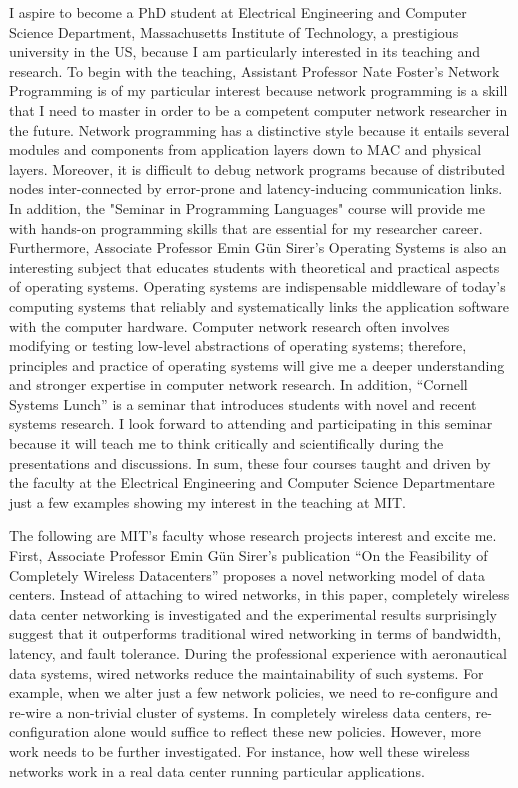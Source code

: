 \documentclass[a4paper,10pt]{report}
\newcommand{\university}{Massachusetts Institute of Technology}
\newcommand{\department}{Electrical Engineering and Computer Science Department}
\newcommand{\uniabbre}{MIT}
\begin{document}
\vspace{0.2cm}
I aspire to become a PhD student at \department, \university, a prestigious university in the US, because I am particularly interested in its teaching and research. To begin with the teaching, Assistant Professor Nate Foster's Network Programming is of my particular interest because network programming is a skill that I need to master in order to be a competent computer network researcher in the future. Network programming has a distinctive style because it entails several modules and components from application layers down to MAC and physical layers. Moreover, it is difficult to debug network programs because of distributed nodes inter-connected by error-prone and latency-inducing communication links. In addition, the "Seminar in Programming Languages" course will provide me with hands-on programming skills that are essential for my researcher career. Furthermore, Associate Professor Emin Gün Sirer's Operating Systems is also an interesting subject that educates students with theoretical and practical aspects of operating systems. Operating systems are indispensable middleware of today's computing systems that reliably and systematically links the application software with the computer hardware. Computer network research often involves modifying or testing low-level abstractions of operating systems; therefore, principles and practice of operating systems will give me a deeper understanding and stronger expertise in computer network research. In addition, ``Cornell Systems Lunch'' is a seminar that introduces students with novel and recent systems research. I look forward to attending and participating in this seminar because it will teach me to think critically and scientifically during the presentations and discussions. In sum, these four courses taught and driven by the faculty at the \department \space are just a few examples showing my interest in the teaching at \uniabbre .

\vspace{0.2cm}
The following are \uniabbre's faculty whose research projects interest and excite me. First, Associate Professor Emin Gün Sirer's publication ``On the Feasibility of Completely Wireless Datacenters'' proposes a novel networking model of data centers. Instead of attaching to wired networks, in this paper, completely wireless data center networking is investigated and the experimental results surprisingly suggest that it outperforms traditional wired networking in terms of bandwidth, latency, and fault tolerance. During the professional experience with aeronautical data systems, wired networks reduce the maintainability of such systems. For example, when we alter just a few network policies, we need to re-configure and re-wire a non-trivial cluster of systems. In completely wireless data centers, re-configuration alone would suffice to reflect these new policies. However, more work needs to be further investigated. For instance, how well these wireless networks work in a real data center running particular applications. 
\end{document}
